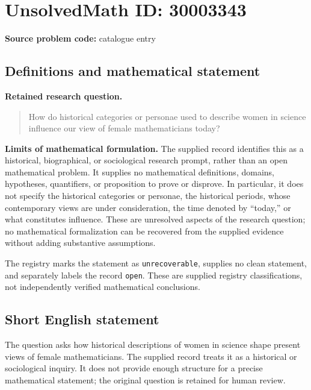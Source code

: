 \documentclass[11pt]{article}
\begin{document}
\section*{UnsolvedMath ID: 30003343}
\textbf{Source problem code:} catalogue entry
\subsection{Definitions and mathematical statement}
\textbf{Retained research question.}
\begin{quote}
How do historical categories or personae used to describe women in science influence our view of female mathematicians today?
\end{quote}
\textbf{Limits of mathematical formulation.} The supplied record identifies this as a historical, biographical, or sociological research prompt, rather than an open mathematical problem. It supplies no mathematical definitions, domains, hypotheses, quantifiers, or proposition to prove or disprove. In particular, it does not specify the historical categories or personae, the historical periods, whose contemporary views are under consideration, the time denoted by ``today,'' or what constitutes influence. These are unresolved aspects of the research question; no mathematical formalization can be recovered from the supplied evidence without adding substantive assumptions.

The registry marks the statement as \texttt{unrecoverable}, supplies no clean statement, and separately labels the record \texttt{open}. These are supplied registry classifications, not independently verified mathematical conclusions.
\subsection{Short English statement}
The question asks how historical descriptions of women in science shape present views of female mathematicians. The supplied record treats it as a historical or sociological inquiry. It does not provide enough structure for a precise mathematical statement; the original question is retained for human review.
\end{document}

